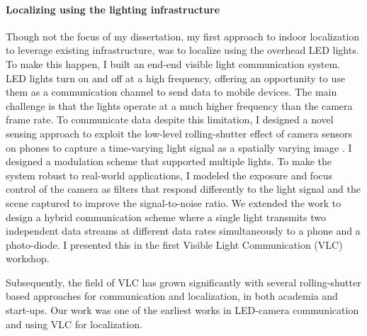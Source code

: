 \documentclass[10pt]{article}
\begin{document}
\paragraph{Localizing using the lighting infrastructure}
Though not the focus of my dissertation, my first approach to indoor localization to leverage existing infrastructure, was to localize using the overhead LED lights. To make this happen, I built an end-end visible light communication system.  LED lights turn on and off at a high frequency, offering an opportunity to use them as a communication channel to send data to mobile devices. The main challenge is that the lights operate at a much higher frequency than the camera frame rate.%
To communicate data despite this limitation, I designed a novel sensing approach to exploit the low-level rolling-shutter effect of camera sensors on phones to capture a time-varying light signal as a spatially varying image \cite{rajagopal2014visual, rajagopal2014demonstration}. %
I designed a modulation scheme that supported multiple lights.  
To make the system robust to real-world applications, I modeled the exposure and focus control of the camera as
filters that respond differently to the light signal and the scene
captured to improve the signal-to-noise ratio. %
We extended the work
\cite{rajagopal2014hybrid} to design a hybrid communication scheme
where a single light transmits two independent data streams at
different data rates simultaneously to a phone and a photo-diode. I
presented this in the first Visible Light Communication
(VLC) workshop. %

Subsequently, the field of
VLC has grown significantly with several rolling-shutter based
approaches for communication and localization, in both academia and
start-ups. Our work was one of the earliest works in LED-camera communication and using VLC for
localization. 
\end{document}
